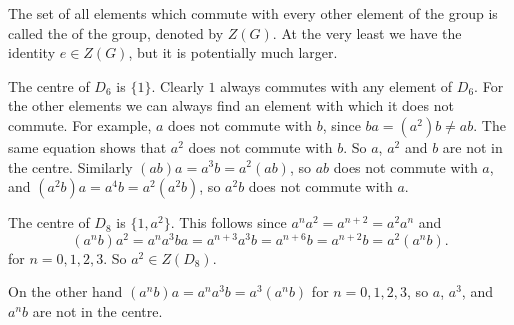 The set of all elements which commute with every other element of the 
group is called the  of the group, 
denoted by $Z(G)$.  At the very least we have the identity $e \in 
Z(G)$, but it is potentially much larger.

\begin{example}
  The centre of $D_{6}$ is $\{1\}$.  Clearly $1$ always commutes with any
  element of $D_{6}$.  For the other elements we can always find an element
  with which it does not commute.  For example, $a$ does not commute with
  $b$, since $ba = (a^{2})b \ne ab$.  The same equation shows that $a^{2}$
  does not commute with $b$.  So $a$, $a^{2}$ and $b$ are not in the centre.
  Similarly $(ab)a = a^{3}b = a^{2}(ab)$, so $ab$ does not commute with $a$,
  and $(a^{2}b)a = a^{4}b = a^{2}(a^{2}b)$, so $a^{2}b$ does not commute
  with $a$.
\end{example}

\begin{example}\label{eg:D8centre}
  The centre of $D_{8}$ is $\{1, a^{2}\}$.  This follows since $a^{n}a^{2} =
  a^{n+2} = a^{2}a^{n}$ and
  \[
    (a^{n}b)a^{2} = a^{n}a^{3}ba = a^{n+3}a^{3}b = a^{n+6}b = a^{n+2}b =
    a^{2}(a^{n}b).
  \]
   for $n = 0, 1, 2, 3$.  So $a^{2} \in Z(D_{8})$.
   
   On the other hand $(a^{n}b)a = a^{n}a^{3}b = a^{3}(a^{n}b)$ for $n = 0, 1,
   2, 3$, so $a$, $a^{3}$, and $a^{n}b$ are not in the centre.
\end{example}

